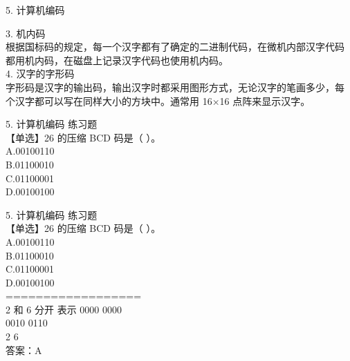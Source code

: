 \documentclass[aspectratio=169]{beamer}
\begin{document}
\begin{frame}[t]{5. 计算机编码} \vspace{20pt}

    3. 机内码\\
    根据国标码的规定，每一个汉字都有了确定的二进制代码，在微机内部汉字代码
    都用机内码，在磁盘上记录汉字代码也使用机内码。\\
    4. 汉字的字形码\\

    字形码是汉字的输出码，输出汉字时都采用图形方式，无论汉字的笔画多少，每
    个汉字都可以写在同样大小的方块中。通常用 16×16 点阵来显示汉字。\\
\end{frame}



\begin{frame}[t]{5. 计算机编码} \vspace{20pt}
    练习题\\
    【单选】26 的压缩 BCD 码是（ ）。\\

    A.00100110 \\B.01100010\\
    C.01100001\\ D.00100100\\
\end{frame}



\begin{frame}[t]{5. 计算机编码} \vspace{20pt}
    练习题\\
    【单选】26 的压缩 BCD 码是（ ）。\\
    A.00100110 \\B.01100010\\
    C.01100001\\ D.00100100\\

    ==================\\
    2 和 6  分开  表示
0000 0000 \\
0010 0110\\
2 6\\

    答案：A\\
\end{frame}
\end{document}
